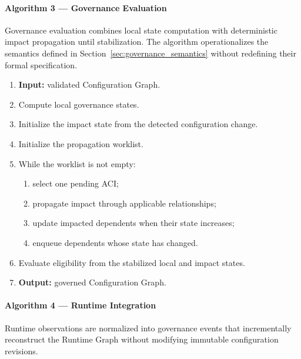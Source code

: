 \documentclass[10pt]{article}
\begin{document}
\paragraph{Algorithm 3 --- Governance Evaluation}

Governance evaluation combines local state computation with deterministic
impact propagation until stabilization. The algorithm operationalizes the
semantics defined in Section~\ref{sec:governance_semantics} without redefining
their formal specification.

\begin{algorithm}[t]
	\caption{Governance Evaluation}
	\begin{enumerate}
		\item \textbf{Input:} validated Configuration Graph.
		\item Compute local governance states.
		\item Initialize the impact state from the detected configuration change.
		\item Initialize the propagation worklist.
		\item While the worklist is not empty:
		\begin{enumerate}
			\item select one pending ACI;
			\item propagate impact through applicable relationships;
			\item update impacted dependents when their state increases;
			\item enqueue dependents whose state has changed.
		\end{enumerate}
		\item Evaluate eligibility from the stabilized local and impact states.
		\item \textbf{Output:} governed Configuration Graph.
	\end{enumerate}
\end{algorithm}

\paragraph{Algorithm 4 --- Runtime Integration}

Runtime observations are normalized into governance events that incrementally
reconstruct the Runtime Graph without modifying immutable configuration
revisions.
\end{document}
